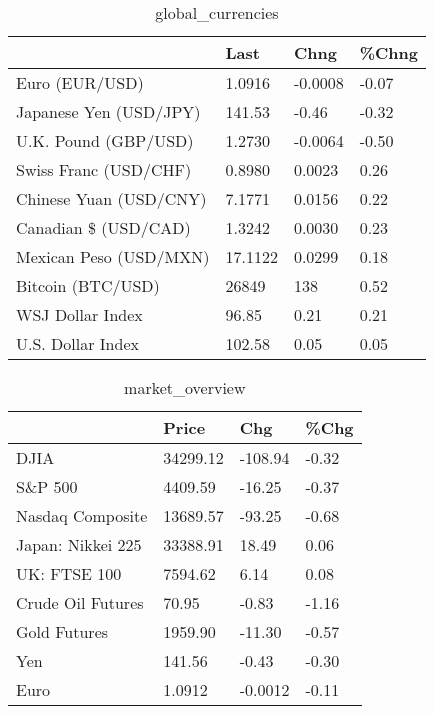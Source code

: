 \documentclass{article}%
\begin{document}
%


\begin{table}[htbp]%
\caption{global\_currencies}%
\centering%
\begin{adjustbox}{width=1\textwidth}%
\begin{tabular}{llll}
\toprule
                       &    Last &    Chng & \%Chng \\
\midrule
        Euro (EUR/USD) &  1.0916 & -0.0008 & -0.07 \\
Japanese Yen (USD/JPY) &  141.53 &   -0.46 & -0.32 \\
  U.K. Pound (GBP/USD) &  1.2730 & -0.0064 & -0.50 \\
 Swiss Franc (USD/CHF) &  0.8980 &  0.0023 &  0.26 \\
Chinese Yuan (USD/CNY) &  7.1771 &  0.0156 &  0.22 \\
  Canadian \$ (USD/CAD) &  1.3242 &  0.0030 &  0.23 \\
Mexican Peso (USD/MXN) & 17.1122 &  0.0299 &  0.18 \\
     Bitcoin (BTC/USD) &   26849 &     138 &  0.52 \\
      WSJ Dollar Index &   96.85 &    0.21 &  0.21 \\
     U.S. Dollar Index &  102.58 &    0.05 &  0.05 \\
\bottomrule
\end{tabular}
%
\end{adjustbox}%
\end{table}

%


\begin{table}[htbp]%
\caption{market\_overview}%
\centering%
\begin{adjustbox}{width=1\textwidth}%
\begin{tabular}{llll}
\toprule
                  &    Price &     Chg &  \%Chg \\
\midrule
             DJIA & 34299.12 & -108.94 & -0.32 \\
          S\&P 500 &  4409.59 &  -16.25 & -0.37 \\
 Nasdaq Composite & 13689.57 &  -93.25 & -0.68 \\
Japan: Nikkei 225 & 33388.91 &   18.49 &  0.06 \\
     UK: FTSE 100 &  7594.62 &    6.14 &  0.08 \\
Crude Oil Futures &    70.95 &   -0.83 & -1.16 \\
     Gold Futures &  1959.90 &  -11.30 & -0.57 \\
              Yen &   141.56 &   -0.43 & -0.30 \\
             Euro &   1.0912 & -0.0012 & -0.11 \\
\bottomrule
\end{tabular}
%
\end{adjustbox}%
\end{table}

%
\end{document}
